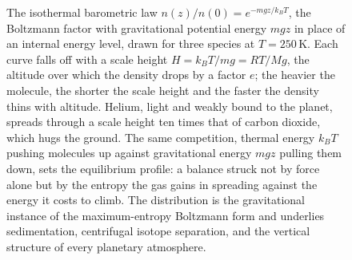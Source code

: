 \begin{figure}[htbp]
\centering
{}
\caption[The barometric distribution for three gas species]{The isothermal
barometric law $n(z)/n(0)=e^{-mgz/k_BT}$, the Boltzmann factor with
gravitational potential energy $mgz$ in place of an internal energy level,
drawn for three species at $T=250\,\si{\kelvin}$. Each curve falls off with a
scale height $H=k_BT/mg=RT/Mg$, the altitude over which the density drops by a
factor $e$; the heavier the molecule, the shorter the scale height and the
faster the density thins with altitude. Helium, light and weakly bound to the
planet, spreads through a scale height ten times that of carbon dioxide, which
hugs the ground. The same competition, thermal energy $k_BT$ pushing molecules
up against gravitational energy $mgz$ pulling them down, sets the equilibrium
profile: a balance struck not by force alone but by the entropy the gas gains
in spreading against the energy it costs to climb. The distribution is the
gravitational instance of the maximum-entropy Boltzmann form and underlies
sedimentation, centrifugal isotope separation, and the vertical structure of
every planetary atmosphere.}
\label{fig:vol04ch04:barometric-distribution}
\end{figure}
